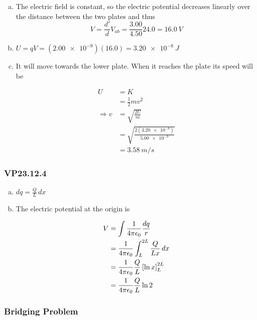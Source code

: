 \documentclass{article}
\begin{document}
\begin{enumerate}[a)]
  \item The electric field is constant, so the electric potential decreases linearly over the distance between the two plates and thus \[V = \frac{d'}{d} V_{ab} = \frac{3.00}{4.50} 24.0 = \qty{16.0}{V}\]

  \item $U = q V = (\num{2.00e-9}) (16.0) = \qty{3.20e-8}{J}$

  \item It will move towards the lower plate. When it reaches the plate its speed will be

        \begin{align*}
          U             & = K                                              \\
                        & = \frac{1}{2} m v^2                              \\
          \Rightarrow v & = \sqrt{\frac{2 U}{m}}                           \\
                        & = \sqrt{\frac{2 (\num{3.20e-8})}{\num{5.00e-9}}} \\
                        & = \qty{3.58}{m/s}
        \end{align*}
\end{enumerate}

\subsubsection{VP23.12.4}

\begin{enumerate}[a)]
  \item $dq = \frac{Q}{L} \,dx$

  \item The electric potential at the origin is

        \begin{align*}
          V & = \int \frac{1}{4 \pi \epsilon_0} \frac{dq}{r}                       \\
            & = \frac{1}{4 \pi \epsilon_0} \int_L^{2 L} \frac{Q}{L x} \,dx         \\
            & = \frac{1}{4 \pi \epsilon_0} \frac{Q}{L} \left[ \ln x \right]_L^{2L} \\
            & = \frac{1}{4 \pi \epsilon_0} \frac{Q}{L} \ln 2
        \end{align*}
\end{enumerate}

\subsubsection{Bridging Problem}
\end{document}
